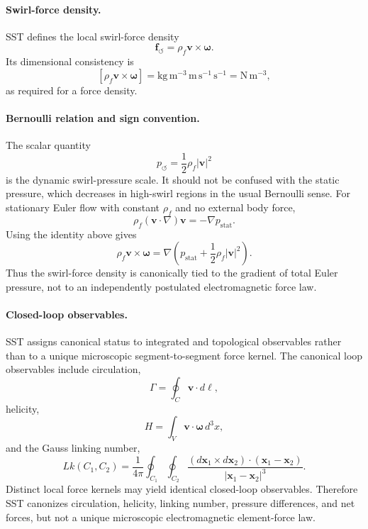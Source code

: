 \documentclass[11pt]{article}
\theoremstyle{definition}
\theoremstyle{plain}
\theoremstyle{remark}
\newcommand{\rhoF}{{\rho_{\!f}}}
\begin{document}
        \paragraph{Swirl-force density.}
        SST defines the local swirl-force density
        \[
        \boxed{
        \mathbf f_{\circlearrowleft}
        =
        \rhoF\mathbf v\times\boldsymbol{\omega}.
        }
        \]
        Its dimensional consistency is
        \[
        [\rhoF\mathbf v\times\boldsymbol{\omega}]
        =
        \mathrm{kg\,m^{-3}}\,
        \mathrm{m\,s^{-1}}\,
        \mathrm{s^{-1}}
        =
        \mathrm{N\,m^{-3}},
        \]
        as required for a force density.

        \paragraph{Bernoulli relation and sign convention.}
        The scalar quantity
        \[
        p_{\circlearrowleft}
        =
        \frac12\rhoF|\mathbf v|^2
        \]
        is the dynamic swirl-pressure scale.  It should not be confused with the
        static pressure, which decreases in high-swirl regions in the usual
        Bernoulli sense.  For stationary Euler flow with constant
        \(\rhoF\) and no external body force,
        \[
        \rhoF(\mathbf v\cdot\nabla)\mathbf v
        =
        -\nabla p_{\mathrm{stat}} .
        \]
        Using the identity above gives
        \[
        \boxed{
        \rhoF\mathbf v\times\boldsymbol{\omega}
        =
        \nabla\!\left(
        p_{\mathrm{stat}}
        +
        \frac12\rhoF|\mathbf v|^2
        \right).
        }
        \]
        Thus the swirl-force density is canonically tied to the gradient of total
        Euler pressure, not to an independently postulated electromagnetic force law.

        \paragraph{Closed-loop observables.}
        SST assigns canonical status to integrated and topological observables rather
        than to a unique microscopic segment-to-segment force kernel.  The canonical
        loop observables include circulation,
        \[
        \Gamma
        =
        \oint_C \mathbf v\cdot d\boldsymbol{\ell},
        \]
        helicity,
        \[
        H
        =
        \int_V \mathbf v\cdot\boldsymbol{\omega}\,d^3x,
        \]
        and the Gauss linking number,
        \[
        Lk(C_1,C_2)
        =
        \frac{1}{4\pi}
        \oint_{C_1}\oint_{C_2}
        \frac{
        (d\mathbf x_1\times d\mathbf x_2)\cdot(\mathbf x_1-\mathbf x_2)
        }{
        |\mathbf x_1-\mathbf x_2|^3
        }.
        \]
        Distinct local force kernels may yield identical closed-loop observables.
        Therefore SST canonizes circulation, helicity, linking number, pressure
        differences, and net forces, but not a unique microscopic electromagnetic
        element-force law.
\end{document}
